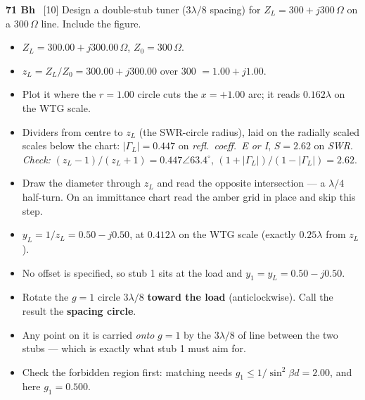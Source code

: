 \begin{asked}{\textbf{71 Bh} \ [10]}
Design a double-stub tuner ($3\lambda/8$ spacing) for $Z_L = 300+j300\,\Omega$ on a $300\,\Omega$ line. Include the figure.
\end{asked}
\begin{itemize}
  \item $Z_L = 300.00 + j300.00\,\Omega$, $Z_0 = 300\,\Omega$.
\end{itemize}
\begin{itemize}
  \item $z_L = Z_L/Z_0 = 300.00 + j300.00$ over $300$ $=1.00 + j1.00$.
  \item Plot it where the $r = 1.00$ circle cuts the $x = +1.00$ arc; it reads $0.162\lambda$ on the WTG scale.
  \item Dividers from centre to $z_L$ (the SWR-circle radius), laid on the radially scaled scales below the chart: $|\Gamma_L| = 0.447$ on \emph{refl.\ coeff.\ E or I}, $S = 2.62$ on \emph{SWR}. \textit{Check:} $(z_L-1)/(z_L+1) = 0.447\angle 63.4^\circ$, $(1+|\Gamma_L|)/(1-|\Gamma_L|) = 2.62$.
\end{itemize}
\begin{itemize}
  \item Draw the diameter through $z_L$ and read the opposite intersection --- a $\lambda/4$ half-turn. On an immittance chart read the amber grid in place and skip this step.
  \item $y_L = 1/z_L = 0.50 - j0.50$, at $0.412\lambda$ on the WTG scale (exactly $0.25\lambda$ from $z_L$).
\end{itemize}
\begin{itemize}
  \item No offset is specified, so stub 1 sits at the load and $y_1 = y_L = 0.50 - j0.50$.
\end{itemize}
\begin{itemize}
  \item Rotate the $g=1$ circle $3\lambda/8$ \textbf{toward the load} (anticlockwise). Call the result the \textbf{spacing circle}.
  \item Any point on it is carried \emph{onto} $g=1$ by the $3\lambda/8$ of line between the two stubs --- which is exactly what stub 1 must aim for.
  \item Check the forbidden region first: matching needs $g_1 \le 1/\sin^2\beta d = 2.00$, and here $g_1 = 0.500$. \checkmark
\end{itemize}
